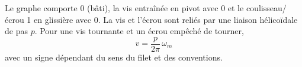 \begin{corrigebox}
Le graphe comporte 0 (bâti), la vis entraînée en pivot avec 0 et le
                coulisseau/écrou 1 en glissière avec 0. La vis et l'écrou sont reliés par
                une liaison hélicoïdale de pas $p$.
Pour une vis tournante et un écrou empêché de tourner,
                \[\boxed{v=\frac{p}{2\pi}\,\omega_m}\]
                avec un signe dépendant du sens du filet et des conventions.
\end{corrigebox}
